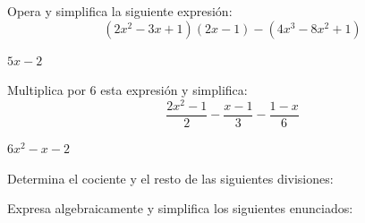 \documentclass[addpoints,spanish, 12pt,a4paper]{exam}
\begin{document}
\begin{questions}
\begin{parts}
\end{parts}
\addpoints


\question [2] Opera y simplifica la siguiente expresión: $$\left(2x^2-3x+1\right)\left(2x-1\right)-\left(4x^3-8x^2+1\right) $$
\begin{solution}
$5x-2$
\end{solution}

\question [2] Multiplica por 6 esta expresión y simplifica: $$\dfrac{2x^2-1}{2}-\dfrac{x-1}{3}-\dfrac{1-x}{6}$$
\begin{solution}
$ 6x^2-x-2$
\end{solution}

\question  Determina el cociente y el resto de las siguientes divisiones:
\addpoints

\question Expresa algebraicamente y simplifica los siguientes enunciados:
\end{questions}
\end{document}
